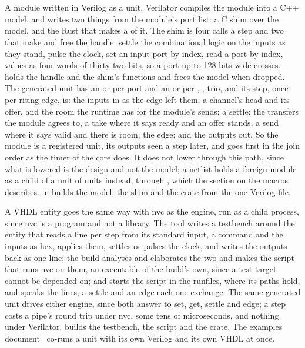\section{}
\label{sec:r-foreign}

A module written in Verilog as a unit. Verilator compiles the module
into a C++ model, and  writes two things from the
module's port list: a C shim over the model, and the Rust that makes
a  of it. The shim is four calls a step and two that make
and free the handle: settle the combinational logic on the inputs as
they stand, pulse the clock, set an input port by index, read a port
by index, values as four
words of thirty-two bits, so a port up to 128 bits wide crosses.
 holds the handle and the shim's functions and frees the
model when dropped. The generated unit has an  or
 per port and an  or  per ,
,  trio, and its step, once per rising
edge, is: the inputs in as the edge left them, a channel's head and
its offer, and the room the runtime has for the module's sends; a
settle; the transfers the module agrees to, a take where it says
ready and an offer stands, a send where it says valid and there is
room; the edge; and the outputs out. So the module is a registered
unit, its outputs seen a step later, and goes first in the join
order as the timer of the core does. It does not lower through this
path, since what is lowered is the design and not the model; a
netlist holds a foreign module as a child of a unit of units instead,
through , which the section on the macros
describes.
 in  builds the model,
the shim and the crate from the one Verilog file.

A VHDL entity goes the same way with nvc as the engine, run as a
child process, since nvc is a program and not a library. The tool
writes a testbench around the entity that reads a line per step
from its standard input, a command and the inputs as hex, applies
them, settles or pulses the clock, and writes the outputs back as
one line; the build analyses and elaborates the two and makes the
script that runs nvc on them, an executable of the build's own,
since a test target cannot be depended on; and  starts
the script in the runfiles, where its paths hold, and speaks the
lines, a settle and an edge each one exchange. The same generated
unit drives either engine, since both answer to set, get, settle
and edge; a step costs a pipe's round trip under nvc, some tens of
microseconds, and nothing under Verilator. 
builds the testbench, the script and the crate. The examples
document~\cite{examples} co-runs a unit with its own Verilog and
its own VHDL at once.


